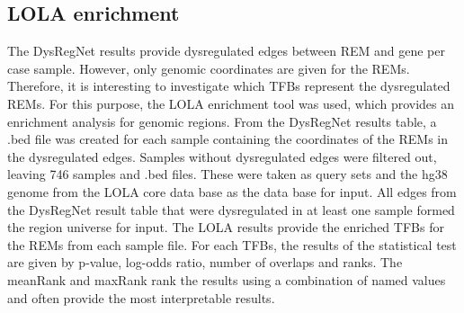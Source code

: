 \documentclass[pdftex,12pt,a4paper]{report}
\begin{document}
\subsection{LOLA enrichment}
The DysRegNet results provide dysregulated edges between REM and gene per case sample. However, only genomic coordinates are given for the REMs. Therefore, it is interesting to investigate which TFBs represent the dysregulated REMs. For this purpose, the LOLA enrichment tool was used, which provides an enrichment analysis for genomic regions. 
From the DysRegNet results table, a .bed file was created for each sample containing the coordinates of the REMs in the dysregulated edges. Samples without dysregulated edges were filtered out, leaving 746 samples and .bed files. These were taken as query sets and the hg38 genome from the LOLA core data base as the data base for input. All edges from the DysRegNet result table that were dysregulated in at least one sample formed the region universe for input. The LOLA results provide the enriched TFBs for the REMs from each sample file. For each TFBs, the results of the statistical test are given by p-value, log-odds ratio, number of overlaps and ranks. The meanRank and maxRank rank the results using a combination of named values and often provide the most interpretable results\cite{LOLA}. 
\end{document}
